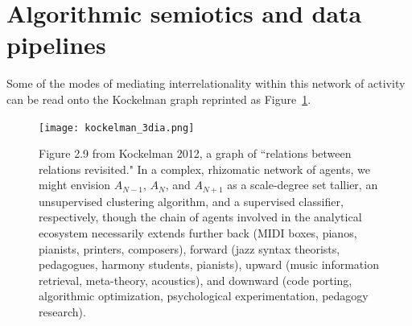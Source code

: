 \section{Algorithmic semiotics and data pipelines}
Some of the modes of mediating interrelationality within this network of activity can be read onto the Kockelman graph reprinted as Figure~\ref{kockelman_3dia}.

\begin{figure}%
	\centering
	\texttt{[image: kockelman\_3dia.png]}
	\caption{Figure 2.9 from Kockelman 2012, a graph of ``relations between relations revisited."  In a complex, rhizomatic network of agents, we might envision $A_{N-1}$, $A_N$, and $A_{N+1}$ as a scale-degree set tallier, an unsupervised clustering algorithm, and a supervised classifier, respectively, though the chain of agents involved in the analytical ecosystem necessarily extends further back (MIDI boxes, pianos, pianists, printers, composers), forward (jazz syntax theorists, pedagogues, harmony students, pianists), upward (music information retrieval, meta-theory, acoustics), and downward (code porting, algorithmic optimization, psychological experimentation, pedagogy research).}
	\label{kockelman_3dia}
\end{figure}

